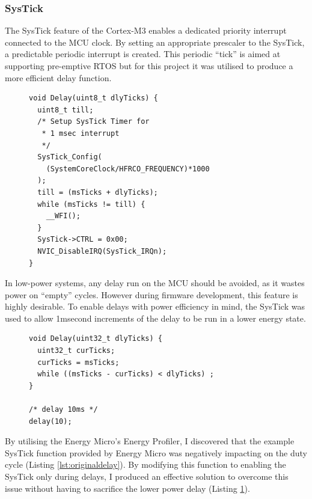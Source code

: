 \subsubsection{SysTick}

The SysTick feature of the Cortex-M3 enables a dedicated priority interrupt connected to the MCU
clock. By setting an appropriate prescaler to the SysTick, a predictable periodic interrupt is created.
This periodic ``tick'' is aimed at supporting pre-emptive \ac{RTOS} but for this project
it was utilised to produce a more efficient delay function.

\begin{figure}
  \begin{center}
    \begin{lstlisting}
void Delay(uint8_t dlyTicks) {
  uint8_t till;
  /* Setup SysTick Timer for
   * 1 msec interrupt
   */
  SysTick_Config(
    (SystemCoreClock/HFRCO_FREQUENCY)*1000
  );
  till = (msTicks + dlyTicks);
  while (msTicks != till) {
    __WFI();
  }
  SysTick->CTRL = 0x00;
  NVIC_DisableIRQ(SysTick_IRQn);
}
    \end{lstlisting}
    \label{lst:newdelay}
  \end{center}
\end{figure}

In low-power systems, any delay run on the MCU should be avoided, as it wastes power on ``empty''
cycles. However during firmware development, this feature is highly desirable. To enable delays with
power efficiency in mind, the SysTick was used to allow 1msecond increments of the delay to be run
in a lower energy state.

\begin{figure}
  \begin{center}
    \begin{lstlisting}
void Delay(uint32_t dlyTicks) {
  uint32_t curTicks;
  curTicks = msTicks;
  while ((msTicks - curTicks) < dlyTicks) ;
}

/* delay 10ms */
delay(10);
    \end{lstlisting}
    \label{lst:originadelay}
  \end{center}
\end{figure}

By utilising the Energy Micro's Energy Profiler, I discovered that the example SysTick function
provided by Energy Micro was negatively impacting on the duty cycle (Listing \ref{lst:originaldelay}). By modifying this function to
enabling the SysTick only during delays, I produced an effective solution to overcome this issue
without having to sacrifice the lower power delay (Listing \ref{lst:newdelay}).


